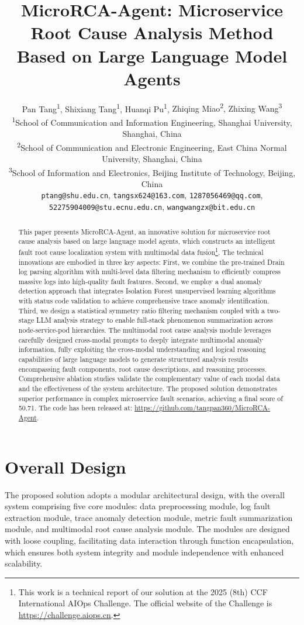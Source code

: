 \documentclass[10pt]{article}
\title{MicroRCA-Agent: Microservice Root Cause Analysis Method Based on Large Language Model Agents}
\author{
    Pan Tang\textsuperscript{\rm 1}, Shixiang Tang\textsuperscript{\rm 1}, Huanqi Pu\textsuperscript{\rm 1}, {Zhiqing Miao\textsuperscript{\rm 2}, Zhixing Wang\textsuperscript{\rm 3}}\\
    \small
    \textsuperscript{\rm 1}School of Communication and Information Engineering, Shanghai University, Shanghai, China\\
    \small
    \textsuperscript{\rm 2}School of Communication and Electronic Engineering, East China Normal University, Shanghai, China\\
    \small
    \textsuperscript{\rm 3}School of Information and Electronics, Beijing Institute of Technology, Beijing, China\\
    \small
    \texttt{ptang@shu.edu.cn}, \texttt{tangsx624@163.com}, \texttt{1287056469@qq.com}, \texttt{52275904009@stu.ecnu.edu.cn}, \texttt{wangwangzx@bit.edu.cn}
}
\begin{document}
\maketitle
\begin{abstract}

This paper presents MicroRCA-Agent, an innovative solution for microservice root cause analysis based on large language model agents, which constructs an intelligent fault root cause localization system with multimodal data fusion\footnote{This work is a technical report of our solution at the 2025 (8th) CCF International AIOps Challenge. The official website of the Challenge is \url{https://challenge.aiops.cn}.}. The technical innovations are embodied in three key aspects: First, we combine the pre-trained Drain log parsing algorithm with multi-level data filtering mechanism to efficiently compress massive logs into high-quality fault features. Second, we employ a dual anomaly detection approach that integrates Isolation Forest unsupervised learning algorithms with status code validation to achieve comprehensive trace anomaly identification. Third, we design a statistical symmetry ratio filtering mechanism coupled with a two-stage LLM analysis strategy to enable full-stack phenomenon summarization across node-service-pod hierarchies. The multimodal root cause analysis module leverages carefully designed cross-modal prompts to deeply integrate multimodal anomaly information, fully exploiting the cross-modal understanding and logical reasoning capabilities of large language models to generate structured analysis results encompassing fault components, root cause descriptions, and reasoning processes. Comprehensive ablation studies validate the complementary value of each modal data and the effectiveness of the system architecture. The proposed solution demonstrates superior performance in complex microservice fault scenarios, achieving a final score of 50.71. The code has been released at: \url{https://github.com/tangpan360/MicroRCA-Agent}.

\end{abstract}

\section{Overall Design}
\label{sec:design}

The proposed solution adopts a modular architectural design, with the overall system comprising five core modules: data preprocessing module, log fault extraction module, trace anomaly detection module, metric fault summarization module, and multimodal root cause analysis module. The modules are designed with loose coupling, facilitating data interaction through function encapsulation, which ensures both system integrity and module independence with enhanced scalability.
\end{document}
